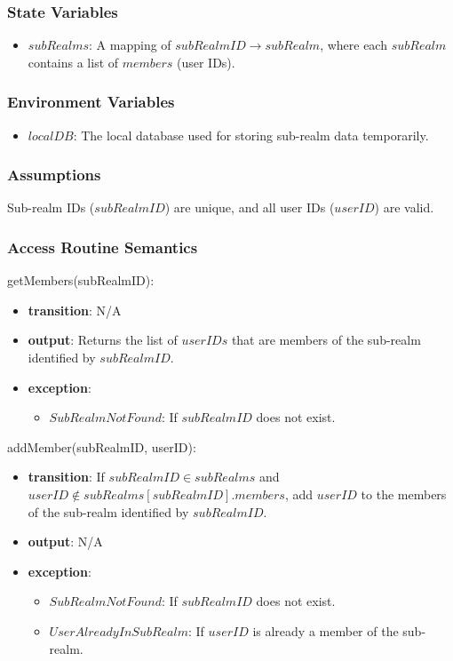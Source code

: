 \documentclass[12pt, titlepage]{article}
\begin{document}
\subsubsection{State Variables}

\begin{itemize}
  \item \( subRealms \): A mapping of \( subRealmID \to subRealm \), where each \( subRealm \) contains a list of \( members \) (user IDs).
\end{itemize}

\subsubsection{Environment Variables}

\begin{itemize}
  \item \( localDB \): The local database used for storing sub-realm data temporarily.
\end{itemize}

\subsubsection{Assumptions}

Sub-realm IDs (\( subRealmID \)) are unique, and all user IDs (\( userID \)) are valid.

\subsubsection{Access Routine Semantics}

\noindent getMembers(subRealmID):
\begin{itemize}
  \item \textbf{transition}: N/A
  \item \textbf{output}: Returns the list of \( userIDs \) that are members of the sub-realm identified by \( subRealmID \).
  \item \textbf{exception}:
        \begin{itemize}
          \item \( SubRealmNotFound \): If \( subRealmID \) does not exist.
        \end{itemize}
\end{itemize}

\noindent addMember(subRealmID, userID):
\begin{itemize}
  \item \textbf{transition}:
        If \( subRealmID \in subRealms \) and \( userID \notin subRealms[subRealmID].members \), add \( userID \) to the members of the sub-realm identified by \( subRealmID \).
  \item \textbf{output}: N/A
  \item \textbf{exception}:
        \begin{itemize}
          \item \( SubRealmNotFound \): If \( subRealmID \) does not exist.
          \item \( UserAlreadyInSubRealm \): If \( userID \) is already a member of the sub-realm.
        \end{itemize}
\end{itemize}
\end{document}
